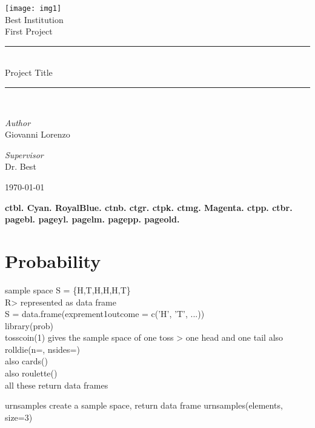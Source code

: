 \documentclass[12pt,a4paper]{report}
\newcommand{\colorselctor}{	{\LARGE \bf {\color{ctbl} ctbl. } {\color{Cyan} Cyan. } {\color{RoyalBlue} RoyalBlue. } {\color{ctnb} ctnb. } {\color{ctgr} ctgr. } {\color{ctpk} ctpk. } {\color{ctmg} ctmg. } {\color{Magenta} Magenta. } {\color{ctpp} ctpp. } {\color{ctbr} ctbr. } \colorbox{pagebl} {pagebl. } \colorbox{pageyl} {pageyl. } \colorbox{pagelm} {pagelm. } \colorbox{pagepp} {pagepp.} \colorbox{pageold} {pageold.}}}
\begin{document}
\begin{titlepage}
\newgeometry{}
\pagecolor{pagebl}
\bfseries
\begin{center} 
\texttt{[image: img1]}\\[1cm]
{\color{ctbr} \LARGE Best Institution\\[1.5cm]}
{\color{ctpp}\Large First Project\\[0.5cm]}
{\color{RoyalBlue}\rule{0.5\textwidth}{2pt}}\\[0.4cm]
{\color{ctmg} \Huge Project Title}\\[0.4cm]
{\color{RoyalBlue}\rule{0.5\textwidth}{2pt}}\\[1.4cm]
\begin{minipage}{0.4\textwidth}
\centering\Large \emph{Author}\\
Giovanni Lorenzo
\end{minipage}
\begin{minipage}{0.4\textwidth}
\centering\Large \emph{Supervisor}\\
Dr. Best
\end{minipage}
\vfil
\Large \today
\end{center}
\end{titlepage}
	
\restoregeometry
\pagecolor{pageold}
\tableofcontents
\listoffigures
\colorselctor

\newpage	

\section{Probability}
sample space S = \{H,T,H,H,H,T\}  \\

R> represented as data frame  \\

S = data.frame(exprement1outcome = c('H', 'T', ...))  \\

library(prob)  \\

tosscoin(1) gives the sample space of one toss > one head and one tail  
also rolldie(n=, nsides=)  \\

also cards()  \\

also roulette()  \\
all these return data frames

urnsamples create a sample space, return data frame
urnsamples(elements, size=3) \\
\end{document}
